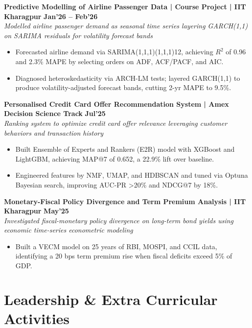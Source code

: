 \documentclass[10pt, a4paper]{article}
\newenvironment{achievelist}{
  \begin{itemize}[leftmargin=1.2em, itemsep=0.5pt, parsep=0pt, topsep=1pt]
    \small
}{
  \end{itemize}
  \vspace{-2pt}
}
\newcommand{\achieve}[1]{\item #1}
\begin{document}
\textbf{Predictive Modelling of Airline Passenger Data | Course Project | IIT Kharagpur} \hfill \textbf{\small Jan'26 -- Feb'26} \\
\textit{\small Modelled airline passenger demand as seasonal time series layering GARCH(1,1) on SARIMA residuals for volatility forecast bands}
\begin{achievelist}
  \achieve{Forecasted airline demand via SARIMA(1,1,1)(1,1,1)12, achieving $R^2$ of 0.96 and 2.3\% MAPE by selecting orders on ADF, ACF/PACF, and AIC.}
  \achieve{Diagnosed heteroskedasticity via ARCH-LM tests; layered GARCH(1,1) to produce volatility-adjusted forecast bands, cutting 2-yr MAPE to 9.5\%.}
\end{achievelist}

\textbf{Personalised Credit Card Offer Recommendation System | Amex Decision Science Track} \hfill \textbf{\small Jul'25} \\
\textit{\small Ranking system to optimize credit card offer relevance leveraging customer behaviors and transaction history}
\begin{achievelist}
  \achieve{Built Ensemble of Experts and Rankers (E2R) model with XGBoost and LightGBM, achieving MAP@7 of 0.652, a 22.9\% lift over baseline.}
  \achieve{Engineered features by NMF, UMAP, and HDBSCAN and tuned via Optuna Bayesian search, improving AUC-PR >20\% and NDCG@7 by 18\%.}
\end{achievelist}

\textbf{Monetary-Fiscal Policy Divergence and Term Premium Analysis | IIT Kharagpur} \hfill \textbf{\small May'25} \\
\textit{\small Investigated fiscal-monetary policy divergence on long-term bond yields using economic time-series econometric modeling}
\begin{achievelist}
  \achieve{Built a VECM model on 25 years of RBI, MOSPI, and CCIL data, identifying a 20 bps term premium rise when fiscal deficits exceed 5\% of GDP.}
\end{achievelist}

\vspace{-2pt}

\section{Leadership \& Extra Curricular Activities}
\end{document}
